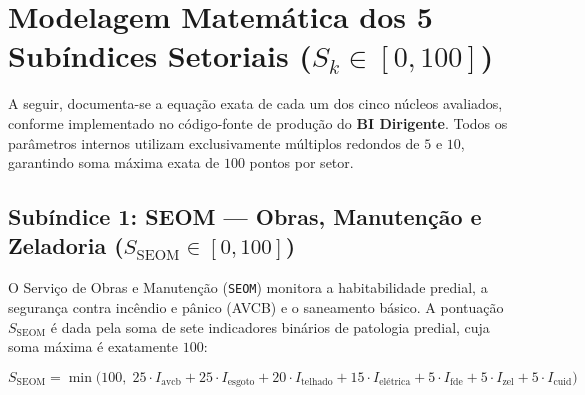 \documentclass[9pt,a4paper]{extarticle}
\begin{document}
\section{Modelagem Matemática dos 5 Subíndices Setoriais ($S_k \in [0, 100]$)}

A seguir, documenta-se a equação exata de cada um dos cinco núcleos avaliados, conforme implementado no código-fonte de produção do \textbf{BI Dirigente}. Todos os parâmetros internos utilizam exclusivamente múltiplos redondos de $5$ e $10$, garantindo soma máxima exata de $100$ pontos por setor.

\subsection{Subíndice 1: SEOM --- Obras, Manutenção e Zeladoria ($S_{\text{SEOM}} \in [0, 100]$)}

O Serviço de Obras e Manutenção (\texttt{SEOM}) monitora a habitabilidade predial, a segurança contra incêndio e pânico (AVCB) e o saneamento básico. A pontuação $S_{\text{SEOM}}$ é dada pela soma de sete indicadores binários de patologia predial, cuja soma máxima é exatamente $100$:

\begin{equation}
S_{\text{SEOM}} = \min\Big(100, \; 25\cdot I_{\text{avcb}} + 25\cdot I_{\text{esgoto}} + 20\cdot I_{\text{telhado}} + 15\cdot I_{\text{elétrica}} + 5\cdot I_{\text{fde}} + 5\cdot I_{\text{zel}} + 5\cdot I_{\text{cuid}}\Big)
\end{equation}
\end{document}
